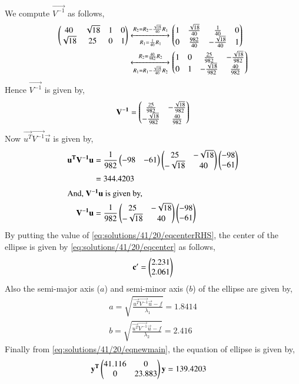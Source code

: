 We compute $\vec{V^{-1}}$ as follows,
\begin{align}
\begin{pmatrix}40&\sqrt{18}&1&0\\\sqrt{18}&25&0&1\end{pmatrix}&\xleftrightarrow[R_1=\frac{1}{40}R_1]{R_2=R_2-\frac{\sqrt{18}}{40}R_1}\begin{pmatrix}1&\frac{\sqrt{18}}{40}&\frac{1}{40}&0\\0&\frac{982}{40}&-\frac{\sqrt{18}}{40}&1\end{pmatrix}\\
&\xleftrightarrow[R_1=R_1-\frac{\sqrt{18}}{40}R_2]{R_2=\frac{40}{982}R_2}\begin{pmatrix}1&0&\frac{25}{982}&-\frac{\sqrt{18}}{982}\\0&1&-\frac{\sqrt{18}}{982}&\frac{40}{982}\end{pmatrix}
\end{align}
Hence $\vec{V^{-1}}$ is given by,
\begin{align}
\mathbf{V^{-1}} = \begin{pmatrix}\frac{25}{982}&-\frac{\sqrt{18}}{982}\\-\frac{\sqrt{18}}{982}&\frac{40}{982}\end{pmatrix}
\end{align}
Now $\vec{u^T}\vec{V^{-1}}\vec{u}$ is given by,
\begin{align}
\mathbf{u^T}\mathbf{V^{-1}}\mathbf{u}&=\frac{1}{982}\begin{pmatrix}-98&-61\end{pmatrix}\begin{pmatrix}25&-\sqrt{18}\\-\sqrt{18}&40\end{pmatrix}\begin{pmatrix}-98\\-61\end{pmatrix}\\&=344.4203\label{eq:solutions/41/20/eqRHS}\\
\intertext{And, $\mathbf{V^{-1}}\mathbf{u}$ is given by,}
\mathbf{V^{-1}}\mathbf{u} &= \frac{1}{982}\begin{pmatrix}25&-\sqrt{18}\\-\sqrt{18}&40\end{pmatrix}\begin{pmatrix}-98\\-61\end{pmatrix}\label{eq:solutions/41/20/eqcenterRHS}\\
\end{align}
By putting the value of \eqref{eq:solutions/41/20/eqcenterRHS}, the center of the ellipse is given by \eqref{eq:solutions/41/20/eqcenter} as follows,
\begin{align}
\mathbf{c^\prime} = \begin{pmatrix}2.231\\2.061\end{pmatrix}
\end{align}
Also the semi-major axis ($a$) and semi-minor axis ($b$) of the ellipse are given by,
\begin{align}
a = \sqrt{\frac{\vec{u^T}\vec{V^{-1}}\vec{u}-f}{\lambda_1}}=1.8414\\
b = \sqrt{\frac{\vec{u^T}\vec{V^{-1}}\vec{u}-f}{\lambda_2}}=2.416
\end{align}
Finally from \eqref{eq:solutions/41/20/eqnewmain}, the equation of ellipse is given by,
\begin{align}
&\mathbf{y^T}\begin{pmatrix}41.116&0\\0&23.883\end{pmatrix}\mathbf{y}=139.4203\label{eq:solutions/41/20/eqFinal}
\end{align}
